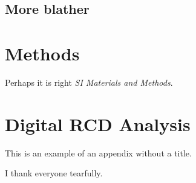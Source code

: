 \documentclass{pnastwo}
\begin{document}
\begin{article}

\subsection{More blather}


\begin{materials}
\section{Methods} 
Perhaps it is right {\it SI Materials and Methods}.

\section{Digital RCD Analysis} 

\end{materials}

\appendix[App 1]

\appendix
This is an example of an appendix without a title.

\begin{acknowledgments}
I thank everyone tearfully. 
\end{acknowledgments}


 


%


\end{article}
\end{document}
